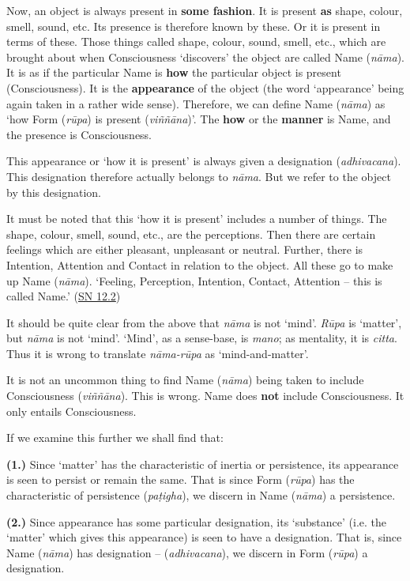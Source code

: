 Now, an object is always present in \textbf{some fashion}. It is present \textbf{as} shape, colour, smell, sound, etc. Its presence is therefore known by these. Or it is present in terms of these. Those things called shape, colour, sound, smell, etc., which are brought about when Consciousness `discovers' the object are called Name (\emph{nāma}). It is as if the particular Name is \textbf{how} the particular object is present (Consciousness). It is the \textbf{appearance} of the object (the word `appearance' being again taken in a rather wide sense). Therefore, we can define Name (\emph{nāma}) as `how Form (\emph{rūpa}) is present (\emph{viññāna})'. The \textbf{how} or the \textbf{manner} is Name, and the presence is Consciousness.

This appearance or `how it is present' is always given a designation (\emph{adhivacana}). This designation therefore actually belongs to \emph{nāma}. But we refer to the object by this designation.

It must be noted that this `how it is present' includes a number of things. The shape, colour, smell, sound, etc., are the perceptions. Then there are certain feelings which are either pleasant, unpleasant or neutral. Further, there is Intention, Attention and Contact in relation to the object. All these go to make up Name (\emph{nāma}). `Feeling, Perception, Intention, Contact, Attention -- this is called Name.' (\href{https://suttacentral.net/sn12.2/en/bodhi}{SN 12.2})

It should be quite clear from the above that \emph{nāma} is not `mind'. \emph{Rūpa} is `matter', but \emph{nāma} is not `mind'. `Mind', as a sense-base, is \emph{mano}; as mentality, it is \emph{citta}. Thus it is wrong to translate \emph{nāma-rūpa} as `mind-and-matter'.

It is not an uncommon thing to find Name (\emph{nāma}) being taken to include Consciousness (\emph{viññāna}). This is wrong. Name does \textbf{not} include Consciousness. It only entails Consciousness.

If we examine this further we shall find that:

\textbf{(1.)} Since `matter' has the characteristic of inertia or persistence, its appearance is seen to persist or remain the same. That is since Form (\emph{rūpa}) has the characteristic of persistence (\emph{paṭigha}), we discern in Name (\emph{nāma}) a persistence.

\textbf{(2.)} Since appearance has some particular designation, its `substance' (i.e. the `matter' which gives this appearance) is seen to have a designation. That is, since Name (\emph{nāma}) has designation -- (\emph{adhivacana}), we discern in Form (\emph{rūpa}) a designation.

